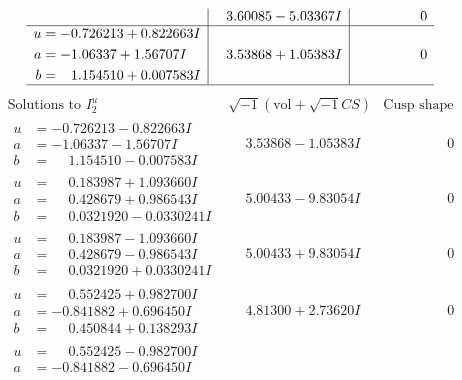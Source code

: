 \documentclass[1p]{elsarticle_modified}
\theoremstyle{definition}
\newcommand{\I}{\sqrt{-1}}
\begin{document}
$$\begin{array}{c|c|c}
 & \phantom{-}3.60085 - 5.03367 I & \phantom{-0.000000 } 0 \\ \hline\begin{aligned}
u &= -0.726213 + 0.822663 I \\
a &= -1.06337 + 1.56707 I \\
b &= \phantom{-}1.154510 + 0.007583 I\end{aligned}
 & \phantom{-}3.53868 + 1.05383 I & \phantom{-0.000000 } 0\\
 \hline 
 \end{array}$$\newpage$$\begin{array}{c|c|c}  
\text{Solutions to }I^u_{2}& \I (\text{vol} + \sqrt{-1}CS) & \text{Cusp shape}\\
 \hline 
\begin{aligned}
u &= -0.726213 - 0.822663 I \\
a &= -1.06337 - 1.56707 I \\
b &= \phantom{-}1.154510 - 0.007583 I\end{aligned}
 & \phantom{-}3.53868 - 1.05383 I & \phantom{-0.000000 } 0 \\ \hline\begin{aligned}
u &= \phantom{-}0.183987 + 1.093660 I \\
a &= \phantom{-}0.428679 + 0.986543 I \\
b &= \phantom{-}0.0321920 - 0.0330241 I\end{aligned}
 & \phantom{-}5.00433 - 9.83054 I & \phantom{-0.000000 } 0 \\ \hline\begin{aligned}
u &= \phantom{-}0.183987 - 1.093660 I \\
a &= \phantom{-}0.428679 - 0.986543 I \\
b &= \phantom{-}0.0321920 + 0.0330241 I\end{aligned}
 & \phantom{-}5.00433 + 9.83054 I & \phantom{-0.000000 } 0 \\ \hline\begin{aligned}
u &= \phantom{-}0.552425 + 0.982700 I \\
a &= -0.841882 + 0.696450 I \\
b &= \phantom{-}0.450844 + 0.138293 I\end{aligned}
 & \phantom{-}4.81300 + 2.73620 I & \phantom{-0.000000 } 0 \\ \hline\begin{aligned}
u &= \phantom{-}0.552425 - 0.982700 I \\
a &= -0.841882 - 0.696450 I \\

\end{aligned}
\end{array}$$
\end{document}
